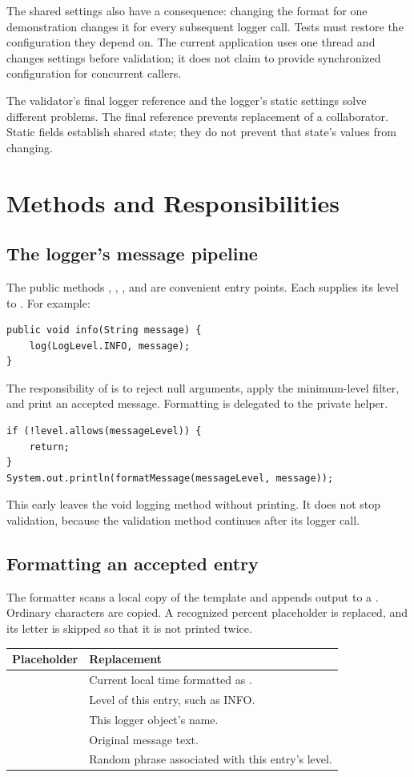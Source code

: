 The shared settings also have a consequence: changing the format for one demonstration changes it for every subsequent logger call. Tests must restore the configuration they depend on. The current application uses one thread and changes settings before validation; it does not claim to provide synchronized configuration for concurrent callers.

The validator's final logger reference and the logger's static settings solve different problems. The final reference prevents replacement of a collaborator. Static fields establish shared state; they do not prevent that state's values from changing.

\newpage
\section{Methods and Responsibilities}
\subsection{The logger's message pipeline}
The public methods , , , and  are convenient entry points. Each supplies its level to . For example:
\begin{lstlisting}
public void info(String message) {
    log(LogLevel.INFO, message);
}
\end{lstlisting}
The responsibility of  is to reject null arguments, apply the minimum-level filter, and print an accepted message. Formatting is delegated to the private  helper.
\begin{lstlisting}
if (!level.allows(messageLevel)) {
    return;
}
System.out.println(formatMessage(messageLevel, message));
\end{lstlisting}
This early  leaves the void logging method without printing. It does not stop validation, because the validation method continues after its logger call.

\subsection{Formatting an accepted entry}
The formatter scans a local copy of the template and appends output to a . Ordinary characters are copied. A recognized percent placeholder is replaced, and its letter is skipped so that it is not printed twice.

\begin{tabularx}{\textwidth}{@{}lY@{}}
\toprule
\textbf{Placeholder} & \textbf{Replacement}\\
\midrule
{} & Current local time formatted as .\\
 & Level of this entry, such as INFO.\\
 & This logger object's name.\\
 & Original message text.\\
 & Random phrase associated with this entry's level.\\
\bottomrule
\end{tabularx}


